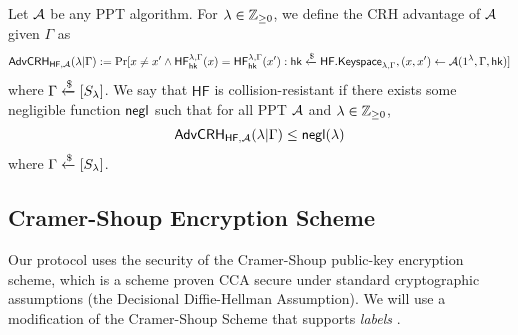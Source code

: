 Let $\mathcal{A}$ be any PPT algorithm. For $\lambda\in\mathbb{Z}_{\geq 0}$, we define the CRH advantage of $\mathcal{A}$ given $\Gamma$ as $$\mathsf{AdvCRH}_{\mathsf{HF},\mathcal{A}}(\lambda | \Gamma):=\Pr[x\neq x'\wedge\mathsf{HF}_{\mathsf{hk}}^{\lambda,\Gamma}(x)=\mathsf{HF}_{\mathsf{hk}}^{\lambda,\Gamma}(x'): \mathsf{hk}\xleftarrow{\$}\mathsf{HF.Keyspace}_{\lambda,\Gamma}, (x,x')\gets\mathcal{A}(1^\lambda,\Gamma,\mathsf{hk})]$$
where $\Gamma\xleftarrow{\$}[S_\lambda]$. We say that $\mathsf{HF}$ is collision-resistant if there exists some negligible function $\mathsf{negl}$ such that for all PPT $\mathcal{A}$ and $\lambda\in\mathbb{Z}_{\geq 0}$, $$\mathsf{AdvCRH}_{\mathsf{HF},\mathcal{A}}(\lambda|\Gamma)\leq\mathsf{negl}(\lambda)$$ where $\Gamma\xleftarrow{\$}[S_\lambda]$.

\subsection{Cramer-Shoup Encryption Scheme}

Our protocol uses the security of the Cramer-Shoup public-key encryption scheme, which is a scheme proven CCA secure under standard cryptographic assumptions (the Decisional Diffie-Hellman Assumption). We will use a modification of the Cramer-Shoup Scheme that supports \textit{labels} \cite{EC:KatOstYun01, iso}.

